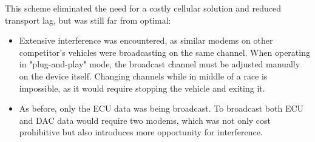 This scheme eliminated the need for a costly cellular solution and reduced transport lag, but was still far from optimal:

\begin{itemize}

\item Extensive interference was encountered, as similar modems on other competitor's vehicles were broadcasting on the same channel. When operating in "plug-and-play" mode, the broadcast channel must be adjusted manually on the device itself. Changing channels while in middle of a race is impossible, as it would require stopping the vehicle and exiting it.

\item As before, only the ECU data was being broadcast. To broadcast both ECU and DAC data would require two modems, which was not only cost prohibitive but also introduces more opportunity for interference. 

\end{itemize}
